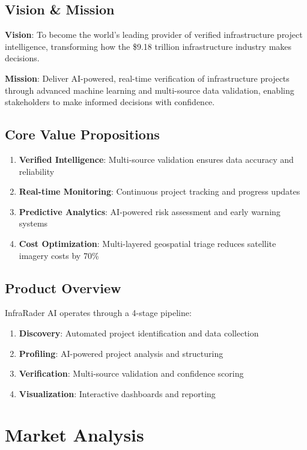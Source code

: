 \documentclass[business]{../templates/infraradar-main}
\begin{document}
\subsection{Vision \& Mission}
\textbf{Vision}: To become the world's leading provider of verified infrastructure project intelligence, transforming how the \$9.18 trillion infrastructure industry makes decisions.

\textbf{Mission}: Deliver AI-powered, real-time verification of infrastructure projects through advanced machine learning and multi-source data validation, enabling stakeholders to make informed decisions with confidence.

\subsection{Core Value Propositions}
\begin{enumerate}
    \item \textbf{Verified Intelligence}: Multi-source validation ensures data accuracy and reliability
    \item \textbf{Real-time Monitoring}: Continuous project tracking and progress updates
    \item \textbf{Predictive Analytics}: AI-powered risk assessment and early warning systems
    \item \textbf{Cost Optimization}: Multi-layered geospatial triage reduces satellite imagery costs by 70\%
\end{enumerate}

\subsection{Product Overview}
InfraRader AI operates through a 4-stage pipeline:
\begin{enumerate}
    \item \textbf{Discovery}: Automated project identification and data collection
    \item \textbf{Profiling}: AI-powered project analysis and structuring
    \item \textbf{Verification}: Multi-source validation and confidence scoring
    \item \textbf{Visualization}: Interactive dashboards and reporting
\end{enumerate}

\section{Market Analysis}
\end{document}
